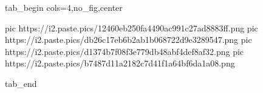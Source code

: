  
 
 
 
 

\ifcmt
  tab_begin cols=4,no_fig,center

     pic https://i2.paste.pics/12460eb250fa4490ac991c27ad8883ff.png
		 pic https://i2.paste.pics/db26c17eb6b2ab1b068722d9e3289547.png
		 pic https://i2.paste.pics/d1374b7f08f3e779db48abf4def8af32.png
		 pic https://i2.paste.pics/b7487d11a2182c7d41f1a64bf6da1a08.png

  tab_end
\fi
